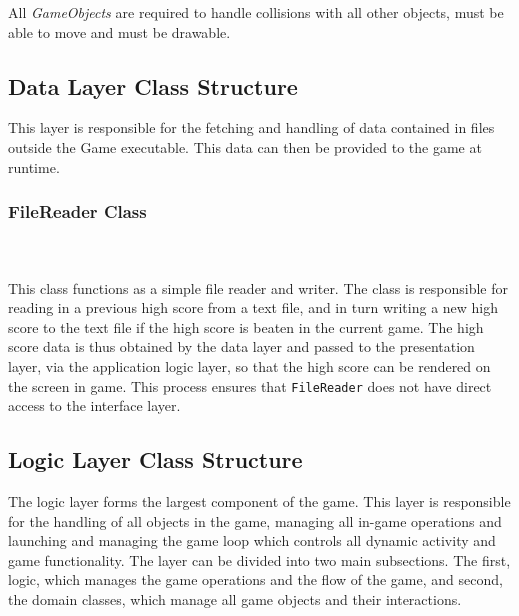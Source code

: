 \documentclass[10pt,twocolumn]{witseiepaper}
\begin{document}
All \textit{GameObjects} are required to handle collisions with all other objects, must be able to move and must be drawable. 



\subsection{Data Layer Class Structure}

This layer is responsible for the fetching and handling of data contained in files outside the Game executable. This data can then be provided to the game at runtime.

\subsubsection{FileReader Class}
~\\
~\\
This class functions as a simple file reader and writer. The class is responsible for reading in a previous high score from a text file, and in turn writing a new high score to the text file if the high score is beaten in the current game. The high score data is thus obtained by the data layer and passed to the presentation layer, via the application logic layer, so that the high score can be rendered on the screen in game. This process ensures that \texttt{FileReader} does not have direct access to the interface layer.

\subsection{Logic Layer Class Structure}

The logic layer forms the largest component of the game. This layer is responsible for the handling of all objects in the game, managing all in-game operations and launching and managing the game loop which controls all dynamic activity and game functionality. The layer can be divided into two main subsections. The first, logic, which manages the game operations and the flow of the game, and second, the domain classes, which manage all game objects and their interactions. 
\end{document}
